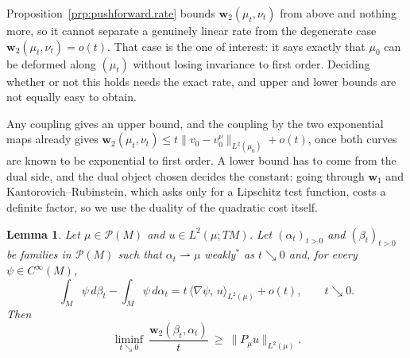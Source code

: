 \documentclass[11pt,reqno]{amsart}
\theoremstyle{plain}
\newtheorem{lem}[thm]{Lemma}
\theoremstyle{definition}
\newcommand{\dw}{\mathbf{w}_2}
\newcommand{\Prob}{\mathcal{P}}
\begin{document}
Proposition~\ref{prp:pushforward.rate} bounds \( \dw(\mu_t,\nu_t) \) from above and nothing more, so it cannot separate a genuinely linear rate from the degenerate case \( \dw(\mu_t,\nu_t)=o(t) \).
That case is the one of interest: it says exactly that \( \mu_0 \) can be deformed along \( (\mu_t) \) without losing invariance to first order.
Deciding whether or not this holds needs the exact rate, and upper and lower bounds are not equally easy to obtain.


Any coupling gives an upper bound, and the coupling by the two exponential maps already gives \( \dw(\mu_t,\nu_t)\le t\lVert v_0-v_0^\nu\rVert_{L^2(\mu_0)}+o(t) \), once both curves are known to be exponential to first order.
A lower bound has to come from the dual side, and the dual object chosen decides the constant: going through \( \mathbf{w}_1 \) and Kantorovich--Rubinstein, which asks only for a Lipschitz test function, costs a definite factor, so we use the duality of the quadratic cost itself.

\begin{lem}\label{lem:duality.lower}
    Let \( \mu\in\Prob(M) \) and \( u\in L^2(\mu;TM) \).
    Let \( (\alpha_t)_{t>0} \) and \( (\beta_t)_{t>0} \) be families in \( \Prob(M) \) such that \( \alpha_t\rightharpoonup\mu \) weakly\( ^\ast \) as \( t\searrow0 \) and, for every \( \psi\in C^\infty(M) \),
        \[
            \int_M\psi\,d\beta_t-\int_M\psi\,d\alpha_t
            =t\,\big\langle\nabla\psi,\,u\big\rangle_{L^2(\mu)}+o(t),\qquad t\searrow0 .
        \]
    Then
    \[
        \liminf_{t\searrow0}\ \frac{\dw(\beta_t,\alpha_t)}{t}\ \ge\ \big\lVert P_\mu u\big\rVert_{L^2(\mu)} .
    \]
\end{lem}
\end{document}
